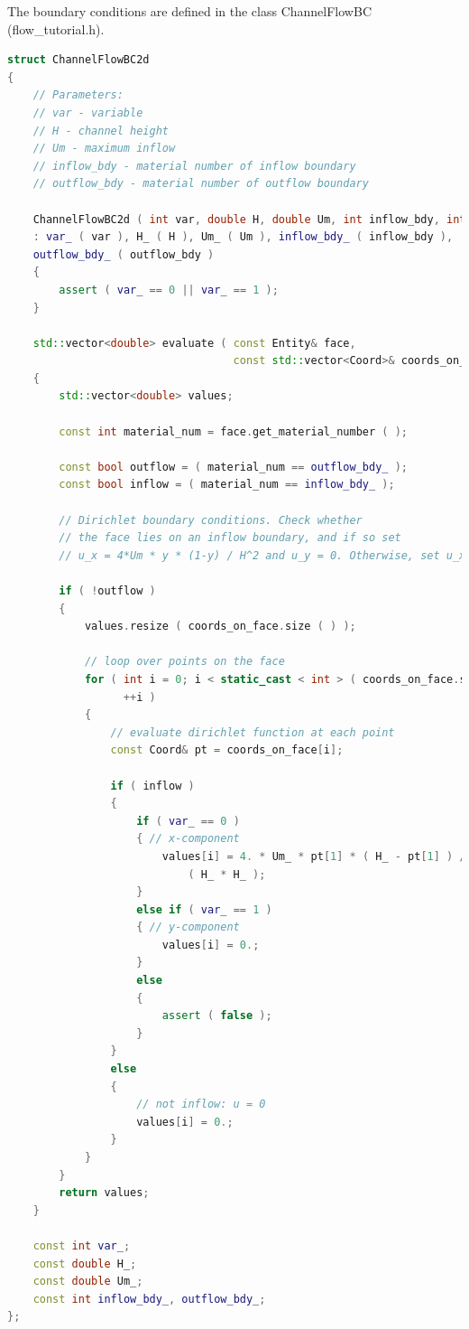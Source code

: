 \documentclass[a4paper, 11pt, twoside]{article}
\begin{document}
The boundary conditions are defined in the class ChannelFlowBC (flow\_tutorial.h).

\begin{lstlisting}[language=C++, basicstyle={\footnotesize, \ttfamily}, keywordstyle=\color{blue},  numbers=none, tabsize=4]
struct ChannelFlowBC2d
{
    // Parameters:
    // var - variable
    // H - channel height
    // Um - maximum inflow
    // inflow_bdy - material number of inflow boundary
    // outflow_bdy - material number of outflow boundary

    ChannelFlowBC2d ( int var, double H, double Um, int inflow_bdy, int outflow_bdy )
    : var_ ( var ), H_ ( H ), Um_ ( Um ), inflow_bdy_ ( inflow_bdy ),
    outflow_bdy_ ( outflow_bdy )
    {
        assert ( var_ == 0 || var_ == 1 );
    }

    std::vector<double> evaluate ( const Entity& face,
                                   const std::vector<Coord>& coords_on_face ) const
    {
        std::vector<double> values;

        const int material_num = face.get_material_number ( );

        const bool outflow = ( material_num == outflow_bdy_ );
        const bool inflow = ( material_num == inflow_bdy_ );

        // Dirichlet boundary conditions. Check whether
        // the face lies on an inflow boundary, and if so set
        // u_x = 4*Um * y * (1-y) / H^2 and u_y = 0. Otherwise, set u_x = u_y = 0 .

        if ( !outflow )
        {
            values.resize ( coords_on_face.size ( ) );

            // loop over points on the face
            for ( int i = 0; i < static_cast < int > ( coords_on_face.size ( ) ); 
                  ++i )
            {
                // evaluate dirichlet function at each point
                const Coord& pt = coords_on_face[i];

                if ( inflow )
                {
                    if ( var_ == 0 )
                    { // x-component
                        values[i] = 4. * Um_ * pt[1] * ( H_ - pt[1] ) / 
                            ( H_ * H_ );
                    }
                    else if ( var_ == 1 )
                    { // y-component
                        values[i] = 0.;
                    }
                    else
                    {
                        assert ( false );
                    }
                }
                else
                {
                    // not inflow: u = 0
                    values[i] = 0.;
                }
            }
        }
        return values;
    }

    const int var_;
    const double H_;
    const double Um_;
    const int inflow_bdy_, outflow_bdy_;
};
\end{lstlisting}
\end{document}
